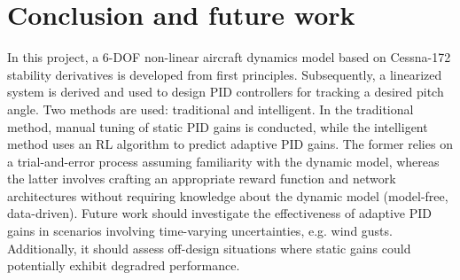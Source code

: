 \documentclass[lettersize,journal]{IEEEtran}
\begin{document}
\section{Conclusion and future work}
In this project, a 6-DOF non-linear aircraft dynamics model based on Cessna-172 stability derivatives is developed from first principles. Subsequently, a linearized system is derived and used to design PID controllers for tracking a desired pitch angle. Two methods are used: traditional and intelligent. In the traditional method, manual tuning of static PID gains is conducted, while the intelligent method uses an RL algorithm to predict adaptive PID gains. The former relies on a trial-and-error process assuming familiarity with the dynamic model, whereas the latter involves crafting an appropriate reward function and network architectures without requiring knowledge about the dynamic model (model-free, data-driven). Future work should investigate the effectiveness of adaptive PID gains in scenarios involving time-varying uncertainties, e.g. wind gusts. Additionally, it should assess off-design situations where static gains could potentially exhibit degradred performance.

\newpage
\end{document}
